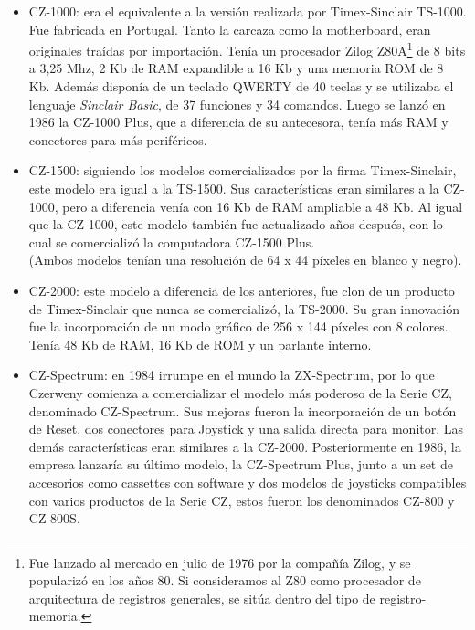 \documentclass[%
  	final,
%
	notitlepage,
	narroweqnarray,
	inline,
 	twoside,
	]{ieee}
\begin{document}
\begin{itemize}

\item CZ-1000: era el equivalente a la versi\'on realizada por Timex-Sinclair TS-1000. Fue fabricada en Portugal. Tanto la carcaza como la motherboard, eran originales tra\'idas por importaci\'on. Ten\'ia un procesador Zilog Z80A\footnote{Fue lanzado al mercado en julio de 1976 por la compa\~n\'ia Zilog, y se populariz\'o en los a\~nos 80. Si consideramos al Z80 como procesador de arquitectura de registros generales, se sit\'ua dentro del tipo de registro-memoria\cite{z80}.} de 8 bits a 3,25 Mhz, 2 Kb de RAM expandible a 16 Kb y una memoria ROM de 8 Kb. Adem\'as dispon\'ia de un teclado QWERTY de 40 teclas y se utilizaba el lenguaje \textit{Sinclair Basic}, de 37 funciones y 34 comandos.
Luego se lanz\'o en 1986 la CZ-1000 Plus, que a diferencia de su antecesora, ten\'ia m\'as RAM y conectores para m\'as perif\'ericos.\\

\item CZ-1500: siguiendo los modelos comercializados por la firma Timex-Sinclair, este modelo era igual a la TS-1500. Sus caracter\'isticas eran similares a la CZ-1000, pero a diferencia ven\'ia con 16 Kb de RAM ampliable a 48 Kb.
Al igual que la CZ-1000, este modelo tambi\'en fue actualizado a\~nos despu\'es, con lo cual se comercializ\'o la computadora CZ-1500 Plus.\\

(Ambos modelos ten\'ian una resoluci\'on de 64 x 44 p\'ixeles en blanco y negro).\\

\item CZ-2000: este modelo a diferencia de los anteriores, fue clon de un producto de Timex-Sinclair que nunca se comercializ\'o, la TS-2000. Su gran innovaci\'on fue la incorporaci\'on de un modo gr\'afico de 256 x 144 p\'ixeles con 8 colores. Ten\'ia 48 Kb de RAM, 16 Kb de ROM y un parlante interno.\\

\item CZ-Spectrum: en 1984 irrumpe en el mundo la ZX-Spectrum, por lo que Czerweny comienza a comercializar el modelo m\'as poderoso de la Serie CZ, denominado CZ-Spectrum. Sus mejoras fueron la incorporaci\'on de un bot\'on de Reset, dos conectores para Joystick y una salida directa para monitor. Las dem\'as caracter\'isticas eran similares a la CZ-2000.
Posteriormente en 1986, la empresa lanzar\'ia su \'ultimo modelo, la CZ-Spectrum Plus, junto a un set de accesorios como cassettes con software y dos modelos de joysticks compatibles con varios productos de la Serie CZ, estos fueron los denominados CZ-800 y CZ-800S.\\
\end{itemize}
\end{document}
